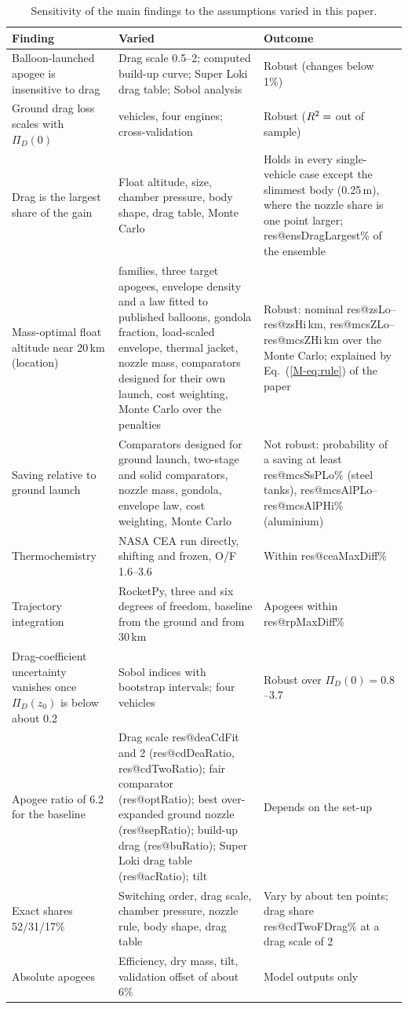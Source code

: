 \documentclass[11pt,a4paper]{article}
\makeatletter
\newcommand{\R}[1]{\csname res@#1\endcsname}
\makeatother
\begin{document}
\begin{table}[!htb]
\centering
\caption{Sensitivity of the main findings to the assumptions varied in this paper.}
\label{tab:robust}
\footnotesize
\begin{tabular}{@{}>{\raggedright\arraybackslash}p{5.2cm}>{\raggedright\arraybackslash}p{5.6cm}>{\raggedright\arraybackslash}p{3.4cm}@{}}
\toprule
Finding & Varied & Outcome \\
\midrule
Balloon-launched apogee is insensitive to drag & Drag scale 0.5--2; computed build-up curve; Super Loki drag table; Sobol analysis & Robust (changes below 1\%) \\
Ground drag loss scales with $\Pi_D(0)$ & 800 vehicles, four engines; cross-validation & Robust ($R^2=\R{cvLd}$ out of sample) \\
Drag is the largest share of the gain & Float altitude, size, chamber pressure, body shape, drag table, Monte Carlo & Holds in every single-vehicle case except the slimmest body (0.25\,m), where the nozzle share is one point larger; \R{ensDragLargest}\% of the ensemble \\
Mass-optimal float altitude near 20\,km (location) & 14 families, three target apogees, envelope density and a law fitted to published balloons, gondola fraction, load-scaled envelope, thermal jacket, nozzle mass, comparators designed for their own launch, cost weighting, Monte Carlo over the penalties & Robust: nominal \R{zsLo}--\R{zsHi}\,km, \R{mcsZLo}--\R{mcsZHi}\,km over the Monte Carlo; explained by Eq.~(\ref{M-eq:rule}) of the paper \\
Saving relative to ground launch & Comparators designed for ground launch, two-stage and solid comparators, nozzle mass, gondola, envelope law, cost weighting, Monte Carlo & Not robust: probability of a saving at least \R{mcsSsPLo}\% (steel tanks), \R{mcsAlPLo}--\R{mcsAlPHi}\% (aluminium) \\
Thermochemistry & NASA CEA run directly, shifting and frozen, O/F 1.6--3.6 & Within \R{ceaMaxDiff}\% \\
Trajectory integration & RocketPy, three and six degrees of freedom, baseline from the ground and from 30\,km & Apogees within \R{rpMaxDiff}\% \\
Drag-coefficient uncertainty vanishes once $\Pi_D(z_0)$ is below about 0.2 & Sobol indices with bootstrap intervals; four vehicles & Robust over $\Pi_D(0)=0.8$--3.7 \\
Apogee ratio of 6.2 for the baseline & Drag scale \R{deaCdFit} and 2 (\R{cdDeaRatio}, \R{cdTwoRatio}); fair comparator (\R{optRatio}); best over-expanded ground nozzle (\R{sepRatio}); build-up drag (\R{buRatio}); Super Loki drag table (\R{acRatio}); tilt & Depends on the set-up \\
Exact shares 52/31/17\% & Switching order, drag scale, chamber pressure, nozzle rule, body shape, drag table & Vary by about ten points; drag share \R{cdTwoFDrag}\% at a drag scale of 2 \\
Absolute apogees & Efficiency, dry mass, tilt, validation offset of about 6\% & Model outputs only \\
\bottomrule
\end{tabular}
\end{table}
\end{document}
